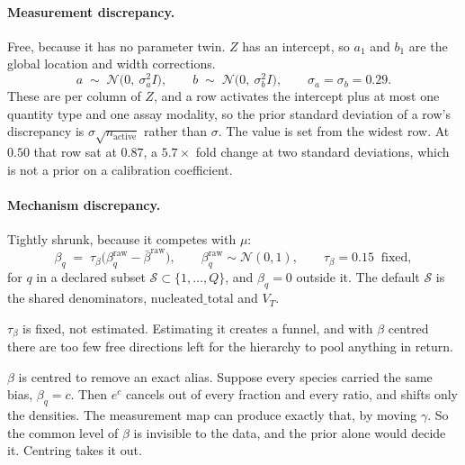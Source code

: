\documentclass[11pt]{article}
\newcommand{\Ncal}{\mathcal{N}}
\begin{document}
\paragraph{Measurement discrepancy.} Free, because it has no parameter twin.
$Z$ has an intercept, so $a_1$ and $b_1$ are the global location and width
corrections.
\begin{equation}
a \;\sim\; \Ncal\big(0,\ \sigma_a^2 I\big),
\qquad
b \;\sim\; \Ncal\big(0,\ \sigma_b^2 I\big),
\qquad
\sigma_a=\sigma_b=0.29 .
\label{eq:abprior}
\end{equation}
These are per column of $Z$, and a row activates the intercept plus at most one
quantity type and one assay modality, so the prior standard deviation of a row's
discrepancy is $\sigma\sqrt{n_{\text{active}}}$ rather than $\sigma$. The value
is set from the widest row. At $0.50$ that row sat at $0.87$, a $5.7\times$ fold
change at two standard deviations, which is not a prior on a calibration
coefficient.

\paragraph{Mechanism discrepancy.} Tightly shrunk, because it competes with
$\mu$:
\begin{equation}
\beta_q \;=\; \tau_\beta\big(\beta^{\text{raw}}_q - \bar\beta^{\text{raw}}\big),
\qquad
\beta^{\text{raw}}_q \sim \Ncal(0,1),
\qquad
\tau_\beta = 0.15 \ \text{ fixed},
\label{eq:betaprior}
\end{equation}
for $q$ in a declared subset $\mathcal{S}\subset\{1,\dots,Q\}$, and $\beta_q=0$
outside it. The default $\mathcal{S}$ is the shared denominators,
$\mathrm{nucleated\_total}$ and $V_T$.

$\tau_\beta$ is fixed, not estimated. Estimating it creates a funnel, and with
$\beta$ centred there are too few free directions left for the hierarchy to pool
anything in return.

$\beta$ is centred to remove an exact alias. Suppose every species carried the
same bias, $\beta_q=c$. Then $e^c$ cancels out of every fraction and every ratio,
and shifts only the densities. The measurement map can produce exactly that, by
moving $\gamma$. So the common level of $\beta$ is invisible to the data, and the
prior alone would decide it. Centring takes it out.
\end{document}
